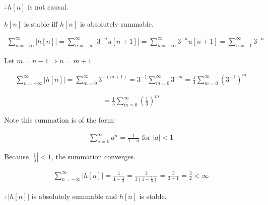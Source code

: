 \documentclass[fleqn]{article}
\begin{document}
\begin{enumerate}
\begin{enumerate}
					$\therefore h[n]$ is not causal.
					
					$h[n]$ is stable iff $h[n]$ is absolutely summable.
					
					\begin{align*}
						\sum_{n=-\infty}^{\infty}{|h[n]|} = \sum_{n=-\infty}^{\infty}{|3^{-n}u[n+1]|} = \sum_{n=-\infty}^{\infty}{3^{-n}u[n+1]} = \sum_{n=-1}^{\infty}{3^{-n}}
					\end{align*}
					
					Let $m = n - 1 \Rightarrow n = m + 1$
					
					\begin{align*}
						\sum_{n=-\infty}^{\infty}{|h[n]|} = \sum_{m=0}^{\infty}{3^{-(m+1)}} = 3^{-1}\sum_{m=0}^{\infty}{3^{-m}} = \frac{1}{3}\sum_{m=0}^{\infty}{(3^{-1})^{m}}
					\end{align*}
					
					\begin{align*}
						 = \frac{1}{3}\sum_{m=0}^{\infty}{\left(\frac{1}{3}\right)^{m}}
					\end{align*}
					
					Note this summation is of the form:
					
					\begin{align*}
						\sum_{n=0}^{\infty}{a^n} = \frac{1}{1-a} \text{ for } |a| < 1 
					\end{align*}
					
					Because $|\frac{1}{3}| < 1$, the summation converges.
					
					\begin{align*}
						\sum_{n=-\infty}^{\infty}{|h[n]|} = \frac{1}{1-\frac{1}{3}} = \frac{3}{3\left(1-\frac{1}{3}\right)} = \frac{3}{3 - 1} = \frac{3}{2} < \infty
					\end{align*}
					
					$\therefore |h[n]|$ is absolutely summable and $h[n]$ is stable.
			\end{enumerate}
			
	\end{enumerate}
	
\end{document}
